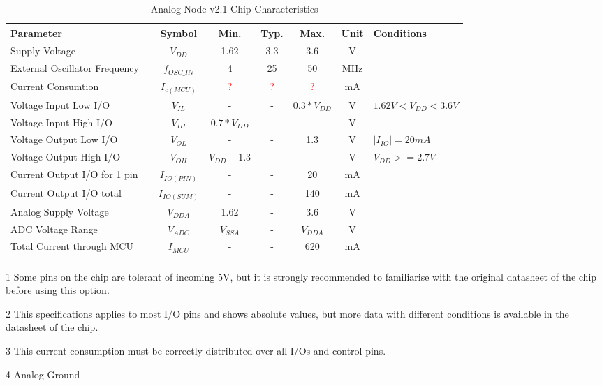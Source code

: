 \documentclass[10pt]{datasheet}
\begin{document}
\begin{table} [H]
\begin{threeparttable}
\caption{Analog Node v2.1 Chip\cite{ref14} Characteristics}
\label{table:analog_node_char}
\begin{tabularx}{\textwidth}{l c | c| c c c | c | X}
    \thickhline
    \textbf{Parameter} & & \textbf{Symbol} & \textbf{Min.} & \textbf{Typ.} & \textbf{Max.} &
    \textbf{Unit} & \textbf{Conditions} \\
    \hline
    Supply Voltage & &$V_{DD}$ & 1.62 & 3.3 & 3.6 & V \\
    \hline
    External Oscillator Frequency & &$f_{OSC\_IN}$ & 4 & 25 & 50 & MHz \\
    \hline
    Current Consumtion & &$I_{c(MCU)}$ & \textcolor{red}? & \textcolor{red}? & \textcolor{red}? & mA \\
    \hline
    Voltage Input Low I/O & &$V_{IL}$ & - & - & $0.3*V_{DD}$ & V & \multirow{2}{*}{$1.62 V<V_{DD}<3.6 V$}\\
    \cline{1-7}
    Voltage Input High I/O\tnote{1} & &$V_{IH}$ & $0.7*V_{DD}$ & - & - & V & \\
    \hline
    Voltage Output Low I/O\tnote{2} & &$V_{OL}$ & - & - & 1.3 & V & $|I_{IO}| = 20 mA$ \\
    \cline{1-7}
    Voltage Output High I/O\tnote{2} & &$V_{OH}$ & $V_{DD}-1.3$ & - & - & V & $V_{DD} >= 2.7 V$\\
    \hline
    Current Output I/O for 1 pin & &$I_{IO(PIN)}$ & - & - & 20 & mA & \\
    \hline
    Current Output I/O total\tnote{3} & &$I_{IO(SUM)}$ & - & - & 140 & mA & \\
    \hline
    Analog Supply Voltage & &$V_{DDA}$ & 1.62 & - & 3.6 & V & \\
    \hline    
    ADC Voltage Range & &$V_{ADC}$ & $V_{SSA}$\tnote{4} & - & $V_{DDA}$ & V & \\
    \hline
    Total Current through MCU & &$I_{MCU}$ & - & - & 620 & mA & \\
    \hline
    \thickhline
\end{tabularx}
\begin{tablenotes}
\item[1] {Some pins on the chip are tolerant of incoming 5V, but it is strongly recommended to familiarise with the original datasheet of the chip before using this option.}
\item[2] {This specifications applies to most I/O pins and shows absolute values, but more data with different conditions is available in the datasheet of the chip.}
\item[3] {This current consumption must be correctly distributed over all I/Os and control pins.}
\item[4] {Analog Ground}
\end{tablenotes}
\end{threeparttable}
\end{table}
\newpage
\end{document}
